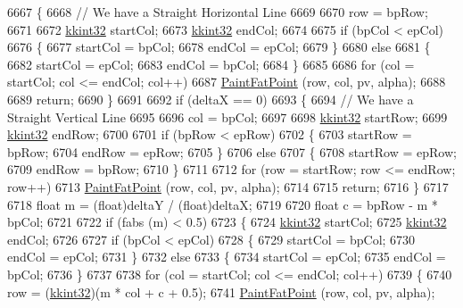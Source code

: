 \begin{DoxyCode}
6667   \{
6668     \textcolor{comment}{// We have a Straight Horizontal Line}
6669 
6670     row = bpRow;
6671     
6672     \hyperlink{namespace_k_k_b_a8fa4952cc84fda1de4bec1fbdd8d5b1b}{kkint32}  startCol;
6673     \hyperlink{namespace_k_k_b_a8fa4952cc84fda1de4bec1fbdd8d5b1b}{kkint32}  endCol;
6674 
6675     \textcolor{keywordflow}{if}  (bpCol < epCol)
6676     \{
6677       startCol = bpCol;
6678       endCol   = epCol;
6679     \}
6680     \textcolor{keywordflow}{else}
6681     \{
6682       startCol = epCol;
6683       endCol   = bpCol;
6684     \}
6685 
6686     \textcolor{keywordflow}{for}  (col = startCol;  col <= endCol;  col++)
6687       \hyperlink{class_k_k_b_1_1_raster_a08d238dd96db4c101911ecf48e9eeae5}{PaintFatPoint} (row, col, pv, alpha);
6688 
6689     \textcolor{keywordflow}{return};
6690   \}
6691 
6692   \textcolor{keywordflow}{if}  (deltaX == 0)
6693   \{
6694     \textcolor{comment}{// We have a Straight Vertical Line}
6695 
6696     col = bpCol;
6697     
6698     \hyperlink{namespace_k_k_b_a8fa4952cc84fda1de4bec1fbdd8d5b1b}{kkint32}  startRow;
6699     \hyperlink{namespace_k_k_b_a8fa4952cc84fda1de4bec1fbdd8d5b1b}{kkint32}  endRow;
6700 
6701     \textcolor{keywordflow}{if}  (bpRow < epRow)
6702     \{
6703       startRow = bpRow;
6704       endRow   = epRow;
6705     \}
6706     \textcolor{keywordflow}{else}
6707     \{
6708       startRow = epRow;
6709       endRow   = bpRow;
6710     \}
6711 
6712     \textcolor{keywordflow}{for}  (row = startRow;  row <= endRow;  row++)
6713       \hyperlink{class_k_k_b_1_1_raster_a08d238dd96db4c101911ecf48e9eeae5}{PaintFatPoint} (row, col, pv, alpha);
6714 
6715     \textcolor{keywordflow}{return};
6716   \}
6717 
6718   \textcolor{keywordtype}{float}  m = (float)deltaY / (\textcolor{keywordtype}{float})deltaX;
6719 
6720   \textcolor{keywordtype}{float}  c = bpRow - m * bpCol;
6721 
6722   \textcolor{keywordflow}{if}  (fabs (m) < 0.5)
6723   \{
6724     \hyperlink{namespace_k_k_b_a8fa4952cc84fda1de4bec1fbdd8d5b1b}{kkint32}  startCol;
6725     \hyperlink{namespace_k_k_b_a8fa4952cc84fda1de4bec1fbdd8d5b1b}{kkint32}  endCol;
6726 
6727     \textcolor{keywordflow}{if}  (bpCol < epCol)
6728     \{
6729       startCol = bpCol;
6730       endCol   = epCol;
6731     \}
6732     \textcolor{keywordflow}{else}
6733     \{
6734       startCol = epCol;
6735       endCol   = bpCol;
6736     \}
6737 
6738     \textcolor{keywordflow}{for}  (col = startCol;  col <= endCol;  col++)
6739     \{
6740       row = (\hyperlink{namespace_k_k_b_a8fa4952cc84fda1de4bec1fbdd8d5b1b}{kkint32})(m * col + c + 0.5);
6741       \hyperlink{class_k_k_b_1_1_raster_a08d238dd96db4c101911ecf48e9eeae5}{PaintFatPoint} (row, col, pv, alpha);

\end{DoxyCode}
